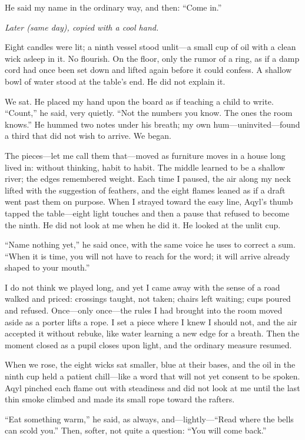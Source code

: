 \documentclass[11pt]{article}
\numberwithin{equation}{section} %
\theoremstyle{plain} %
\theoremstyle{definition} %
\theoremstyle{remark} %
\begin{document}
He said my name in the ordinary way, and then: “Come in.”

\medskip
\noindent\textit{Later (same day), copied with a cool hand.}

Eight candles were lit; a ninth vessel stood unlit—a small cup of oil with a clean wick asleep in it. No flourish. On the floor, only the rumor of a ring, as if a damp cord had once been set down and lifted again before it could confess. A shallow bowl of water stood at the table’s end. He did not explain it.

We sat. He placed my hand upon the board as if teaching a child to write. “Count,” he said, very quietly. “Not the numbers you know. The ones the room knows.” He hummed two notes under his breath; my own hum—uninvited—found a third that did not wish to arrive. We began.

The pieces—let me call them that—moved as furniture moves in a house long lived in: without thinking, habit to habit. The middle learned to be a shallow river; the edges remembered weight. Each time I paused, the air along my neck lifted with the suggestion of feathers, and the eight flames leaned as if a draft went past them on purpose. When I strayed toward the easy line, Aqyl’s thumb tapped the table—eight light touches and then a pause that refused to become the ninth. He did not look at me when he did it. He looked at the unlit cup.

“Name nothing yet,” he said once, with the same voice he uses to correct a sum. “When it is time, you will not have to reach for the word; it will arrive already shaped to your mouth.”

I do not think we played long, and yet I came away with the sense of a road walked and priced: crossings taught, not taken; chairs left waiting; cups poured and refused. Once—only once—the rules I had brought into the room moved aside as a porter lifts a rope. I set a piece where I knew I should not, and the air accepted it without rebuke, like water learning a new edge for a breath. Then the moment closed as a pupil closes upon light, and the ordinary measure resumed.

When we rose, the eight wicks sat smaller, blue at their bases, and the oil in the ninth cup held a patient chill—like a word that will not yet consent to be spoken. Aqyl pinched each flame out with steadiness and did not look at me until the last thin smoke climbed and made its small rope toward the rafters.

“Eat something warm,” he said, as always, and—lightly—“Read where the bells can scold you.” Then, softer, not quite a question: “You will come back.”
\end{document}
